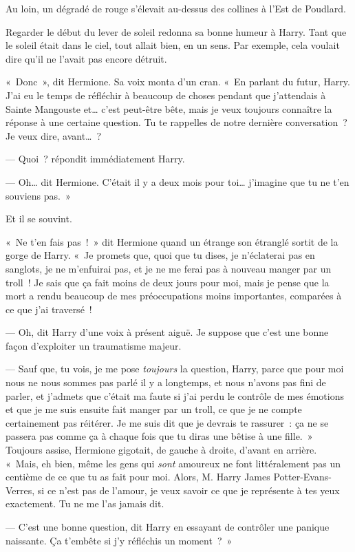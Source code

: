 Au loin, un dégradé de rouge s'élevait au-dessus des collines à l'Est de Poudlard.

Regarder le début du lever de soleil redonna sa bonne humeur à Harry.
Tant que le soleil était dans le ciel, tout allait bien, en un sens.
Par exemple, cela voulait dire qu'il ne l'avait pas encore détruit.

«~Donc~», dit Hermione.
Sa voix monta d'un cran.
«~En parlant du futur, Harry.
J'ai eu le temps de réfléchir à beaucoup de choses pendant que j'attendais à Sainte Mangouste et… c'est peut-être bête, mais je veux toujours connaître la réponse à une certaine question.
Tu te rappelles de notre dernière conversation~?
Je veux dire, avant…~?

--- Quoi~? répondit immédiatement Harry.

--- Oh… dit Hermione.
C'était il y a deux mois pour toi… j'imagine que tu ne t'en souviens pas.~»

Et il se souvint.

«~Ne t'en fais pas~!~»
dit Hermione quand un étrange son étranglé sortit de la gorge de Harry.
«~Je promets que, quoi que tu dises, je n'éclaterai pas en sanglots, je ne m'enfuirai pas, et je ne me ferai pas à nouveau manger par un troll~!
Je sais que ça fait moins de deux jours pour moi, mais je pense que la mort a rendu beaucoup de mes préoccupations moins importantes, comparées à ce que j'ai traversé~!

--- Oh, dit Harry d'une voix à présent aiguë.
Je suppose que c'est une bonne façon d'exploiter un traumatisme majeur.

--- Sauf que, tu vois, je me pose \emph{toujours} la question, Harry, parce que pour moi nous ne nous sommes pas parlé il y a longtemps, et nous n'avons pas fini de parler, et j'admets que c'était ma faute si j'ai perdu le contrôle de mes émotions et que je me suis ensuite fait manger par un troll, ce que je ne compte certainement pas réitérer.
Je me suis dit que je devrais te rassurer~: ça ne se passera pas comme ça à chaque fois que tu diras une bêtise à une fille.~»
Toujours assise, Hermione gigotait, de gauche à droite, d'avant en arrière.
«~Mais, eh bien, même les gens qui \emph{sont} amoureux ne font littéralement pas un centième de ce que tu as fait pour moi.
Alors, M. Harry James Potter-Evans-Verres, si ce n'est pas de l'amour, je veux savoir ce que je représente à tes yeux exactement.
Tu ne me l'as jamais dit.

--- C'est une bonne question, dit Harry en essayant de contrôler une panique naissante.
Ça t'embête si j'y réfléchis un moment~?~»

